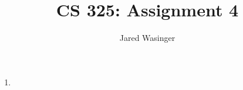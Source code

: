 \documentclass{article}
\begin{document}
\title{CS 325: Assignment 4}
\author{Jared Wasinger}

\maketitle

\begin{enumerate}
	\item 

\end{enumerate}
\end{document}
